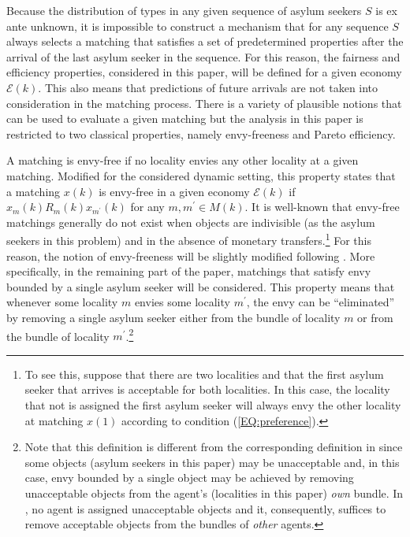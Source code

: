 \documentclass[12pt,fleqn]{article}
\begin{document}
Because the distribution of types in any given sequence of asylum seekers $S$ is ex ante unknown, it is impossible to construct a mechanism that for any sequence $S$ always selects a matching that satisfies a set of predetermined properties after the arrival of the last asylum seeker in the sequence. For this reason, the fairness and efficiency properties, considered in this paper, will be defined for a given economy $\mathcal{E}(k)$. This also means that predictions of future arrivals are not taken into consideration in the matching process. There is a variety of plausible notions that can be used to evaluate a given matching but the analysis in this paper is restricted to two classical properties, namely envy-freeness and Pareto efficiency.

A matching is envy-free \citep{bib:Foley} if no locality envies any other locality at a given matching. Modified for the considered dynamic setting, this property states that a matching $x(k)$ is envy-free in a given economy $\mathcal{E}(k)$ if $x_{m}(k)R_m(k) x_{m^\prime}(k)$ for any $m,m^\prime\in M(k)$. It is well-known that envy-free matchings generally do not exist when objects are indivisible (as the asylum seekers in this problem) and in the absence of monetary transfers.\footnote{To see this, suppose that there are two localities and that the first asylum seeker that arrives is acceptable for both localities. In this case, the locality that not is assigned the first asylum seeker will always envy the other locality at matching $x(1)$ according to condition (\ref{EQ:preference}).} For this reason, the notion of envy-freeness will be slightly modified following \citet{bib:Budish}. More specifically, in the remaining part of the paper, matchings that satisfy envy bounded by a single asylum seeker will be considered. This property means that whenever some locality $m$ envies some locality $m^\prime$, the envy can be ``eliminated'' by removing a single asylum seeker either from the bundle of locality $m$ or from the bundle of locality $m^\prime$.\footnote{Note that this definition is different from the corresponding definition in \citet{bib:Budish} since some objects (asylum seekers in this paper) may be unacceptable and, in this case, envy bounded by a single object may be achieved by removing unacceptable objects from the agent's (localities in this paper) \emph{own} bundle. In \citet{bib:Budish}, no agent is assigned unacceptable objects and it, consequently, suffices to remove acceptable objects from the bundles of \emph{other} agents.}
\end{document}
